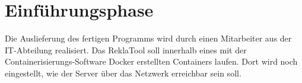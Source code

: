 \section{Einführungsphase}
\label{sec:Einfuehrungsphase}
Die Auslieferung des fertigen Programms wird durch einen Mitarbeiter aus der IT-Abteilung realisiert.
Das ReklaTool soll innerhalb eines mit der Containerisierungs-Software Docker erstellten Containers laufen.
Dort wird noch eingestellt, wie der Server über das Netzwerk erreichbar sein soll.